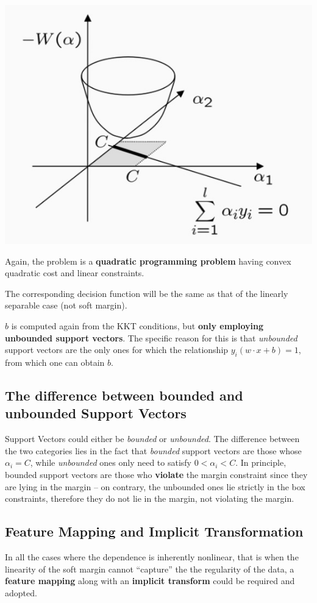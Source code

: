 \documentclass[10pt]{report}
\begin{document}
\begin{center}
\includegraphics[width=.9\linewidth]{./pics/svm/svm-quadratic-programming-C.jpg}
\end{center}

Again, the problem is a \textbf{quadratic programming problem} having convex quadratic
cost and linear constraints.

The corresponding decision function will be the same as that of the linearly
separable case (not soft margin).

\(\hat b\) is computed again from the KKT conditions, but \textbf{only employing
unbounded support vectors}. The specific reason for this is that \emph{unbounded}
support vectors are the only ones for which the relationship \(y_i(w\cdot x + b)
= 1\), from which one can obtain \(b\).

\subsection{The difference between bounded and unbounded Support Vectors}
\label{sec:org10c0789}

Support Vectors could either be \emph{bounded} or \emph{unbounded}. The difference between
the two categories lies in the fact that \emph{bounded} support vectors are those
whose \(\alpha_i = C\), while \emph{unbounded} ones only need to satisfy \(0 < \alpha_i
< C\). In principle, bounded support vectors are those who \textbf{violate} the margin
constraint since they are lying in the margin -- on contrary, the unbounded ones
lie strictly in the box constraints, therefore they do not lie in the margin,
not violating the margin.
\subsection{Feature Mapping and Implicit Transformation}
\label{sec:org9276826}
In all the cases where the dependence is inherently nonlinear, that is when the
linearity of the soft margin cannot ``capture'' the the regularity of the data,
a \textbf{feature mapping} along with an \textbf{implicit transform} could be required and
adopted.
\end{document}

